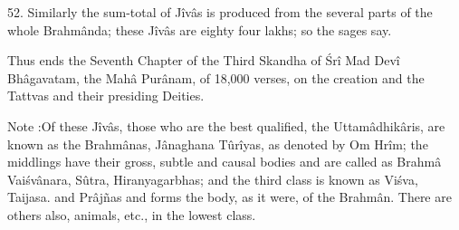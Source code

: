 52. Similarly the sum-total of J\^iv\^as is produced from the several parts of the whole Brahm\^anda; these J\^iv\^as are eighty four lakhs; so the sages say.

Thus ends the Seventh Chapter of the Third Skandha of \'Sr\^i Mad Dev\^i Bh\^agavatam, the Mah\^a Pur\^anam, of 18,000 verses, on the creation and the Tattvas and their presiding Deities.

Note :Of these J\^iv\^as, those who are the best qualified, the Uttam\^adhik\^aris, are known as the Brahm\^anas, J\^anaghana Tûr\^iyas, as denoted by Om Hr\^im; the middlings have their gross, subtle and causal bodies and are called as Brahm\^a Vai\'sv\^anara, Sûtra, Hiranyagarbhas; and the third class is known as Vi\'sva, Taijasa. and Pr\^aj\~nas and forms the body, as it were, of the Brahm\^an. There are others also, animals, etc., in the lowest class.

